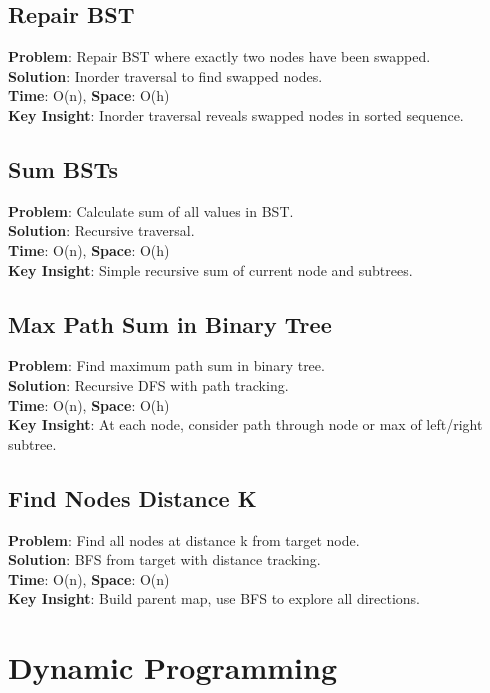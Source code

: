 \documentclass{report}
\begin{document}
\subsection{Repair BST}
\textbf{Problem}: Repair BST where exactly two nodes have been swapped.\\
\textbf{Solution}: Inorder traversal to find swapped nodes.\\
\textbf{Time}: O(n), \textbf{Space}: O(h)\\
\textbf{Key Insight}: Inorder traversal reveals swapped nodes in sorted sequence.

\subsection{Sum BSTs}
\textbf{Problem}: Calculate sum of all values in BST.\\
\textbf{Solution}: Recursive traversal.\\
\textbf{Time}: O(n), \textbf{Space}: O(h)\\
\textbf{Key Insight}: Simple recursive sum of current node and subtrees.

\subsection{Max Path Sum in Binary Tree}
\textbf{Problem}: Find maximum path sum in binary tree.\\
\textbf{Solution}: Recursive DFS with path tracking.\\
\textbf{Time}: O(n), \textbf{Space}: O(h)\\
\textbf{Key Insight}: At each node, consider path through node or max of left/right subtree.

\subsection{Find Nodes Distance K}
\textbf{Problem}: Find all nodes at distance k from target node.\\
\textbf{Solution}: BFS from target with distance tracking.\\
\textbf{Time}: O(n), \textbf{Space}: O(n)\\
\textbf{Key Insight}: Build parent map, use BFS to explore all directions.

\section{Dynamic Programming}
\end{document}

